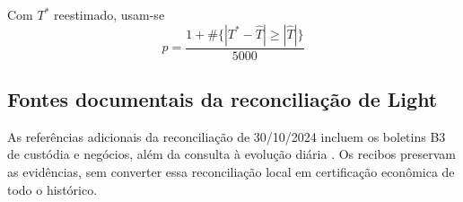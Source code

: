 \documentclass[12 pt]{article}
\begin{document}
Com $T^*$ reestimado, usam-se
\begin{equation}
p=\frac{1+\#\{|T^*-\widehat T|\ge|\widehat T|\}}{5000}
\end{equation}

\subsection{Fontes documentais da reconciliação de Light}
As referências adicionais da reconciliação de 30/10/2024 incluem os
boletins B3 de custódia e negócios, além da consulta à evolução diária
\cite{b3lightcustodia,b3lightnegocios,b3diaria2026}. Os recibos preservam
as evidências, sem converter essa reconciliação local em certificação
econômica de todo o histórico.

\FloatBarrier
\begingroup\small\endgroup
\end{document}
